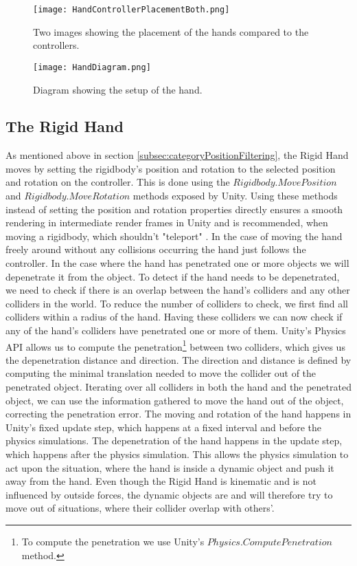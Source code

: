 \begin{figure}[h]
\centering
\texttt{[image: HandControllerPlacementBoth.png]}
\caption{Two images showing the placement of the hands compared to the controllers.}
\label{fig:handControllerPlacement}
\end{figure}

\begin{figure}[h]
\centering
\texttt{[image: HandDiagram.png]}
\caption{Diagram showing the setup of the hand.}
\label{fig:handDiagram}
\end{figure}

\subsection{The Rigid Hand}
\label{subsec:rigidHand}
As mentioned above in section \ref{subsec:categoryPositionFiltering}, the Rigid Hand moves by setting the rigidbody's position and rotation to the selected position and rotation on the controller. This is done using the $Rigidbody.MovePosition$ and $Rigidbody.MoveRotation$ methods exposed by Unity. Using these methods instead of setting the position and rotation properties directly ensures a smooth rendering in intermediate render frames in Unity and is recommended, when moving a rigidbody, which shouldn't "teleport" \parencite{UnityMovePosition2017}. In the case of moving the hand freely around without any collisions occurring the hand just follows the controller. In the case where the hand has penetrated one or more objects we will depenetrate it from the object. To detect if the hand needs to be depenetrated, we need to check if there is an overlap between the hand's colliders and any other colliders in the world. To reduce the number of colliders to check, we first find all colliders within a radius of the hand. Having these colliders we can now check if any of the hand's colliders have penetrated one or more of them. Unity's Physics API allows us to compute the penetration\footnote{To compute the penetration we use Unity's $Physics.ComputePenetration$ method.} between two colliders, which gives us the depenetration distance and direction. The direction and distance is defined by computing the minimal translation needed to move the collider out of the penetrated object. Iterating over all colliders in both the hand and the penetrated object, we can use the information gathered to move the hand out of the object, correcting the penetration error. The moving and rotation of the hand happens in Unity's fixed update step, which happens at a fixed interval and before the physics simulations. The depenetration of the hand happens in the update step, which happens after the physics simulation. This allows the physics simulation to act upon the situation, where the hand is inside a dynamic object and push it away from the hand. Even though the Rigid Hand is kinematic and is not influenced by outside forces, the dynamic objects are and will therefore try to move out of situations, where their collider overlap with others'.

